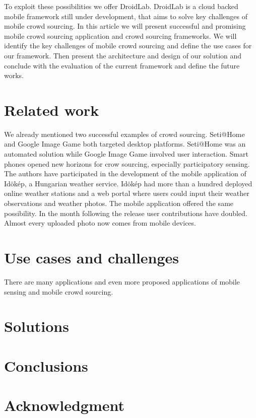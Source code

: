 \documentclass[conference,letterpaper]{IEEEtran}
\begin{document}
To exploit these possibilities we offer DroidLab. DroidLab is a cloud backed mobile framework still under development, that aims to solve key challenges of mobile crowd sourcing. In this article we will present successful and promising mobile crowd sourcing application and crowd sourcing frameworks. We will identify the key challenges of mobile crowd sourcing and define the use cases for our framework. Then present the architecture and design of our solution and conclude with the evaluation of the current framework and define the future works.
\section{Related work}
\label{sec:related_work}
We already mentioned two successful examples of crowd sourcing. Seti@Home and Google Image Game both targeted desktop platforms. Seti@Home was an automated solution while Google Image Game involved user interaction. Smart phones opened new horizons for crow sourcing, especially participatory sensing. The authors have participated in the development of the mobile application of Id\"ok\'ep, a Hungarian weather service. Id\"ok\'ep had more than a hundred deployed online weather stations and a web portal where users could input their weather observations and weather photos. The mobile application offered the same possibility. In the month following the release user contributions have doubled. Almost every uploaded photo now comes from mobile devices.
\section{Use cases and challenges}
\label{sec:use_cases}
There are many applications and even more proposed applications of mobile sensing and mobile crowd sourcing. 
\section{Solutions}
\label{sec:solutions}
\section{Conclusions}
\label{sec:conclusion_and_future_work}
\section{Acknowledgment}
\label{sec:acknowledgment}
\end{document}
